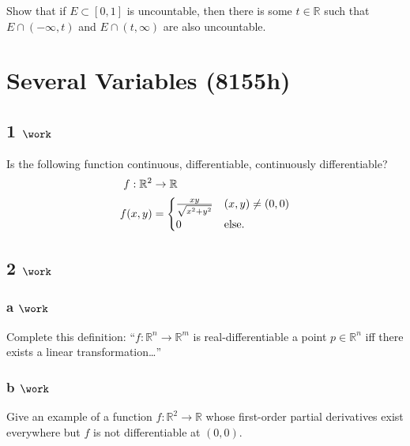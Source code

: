 Show that if \(E\subset [0, 1]\) is uncountable, then there is some
\(t\in {\mathbb{R}}\) such that \(E\cap(-\infty ,t)\) and
\(E\cap(t, \infty)\) are also uncountable.

\hypertarget{several-variables-8155h}{%
\section{Several Variables (8155h)}\label{several-variables-8155h}}

\hypertarget{work-9}{%
\subsection{\texorpdfstring{1
\(\work\)}{1 \textbackslash work}}\label{work-9}}

Is the following function continuous, differentiable, continuously
differentiable?
\begin{align*}  
f: {\mathbb{R}}^2 &\to {\mathbb{R}}\\
f(x, y) &= 
\begin{cases}
{xy \over \sqrt{x^2 + y^2}} & (x, y) \neq (0, 0) \\
0 & \text{else}.
\end{cases}
\end{align*}

\hypertarget{work-10}{%
\subsection{\texorpdfstring{2
\(\work\)}{2 \textbackslash work}}\label{work-10}}

\hypertarget{a-work}{%
\subsubsection{\texorpdfstring{a
\(\work\)}{a \textbackslash work}}\label{a-work}}

Complete this definition: ``\(f: {\mathbb{R}}^n\to {\mathbb{R}}^m\) is
real-differentiable a point \(p\in {\mathbb{R}}^n\) iff there exists a
linear transformation\ldots{}''

\hypertarget{b-work}{%
\subsubsection{\texorpdfstring{b
\(\work\)}{b \textbackslash work}}\label{b-work}}

Give an example of a function \(f:{\mathbb{R}}^2\to {\mathbb{R}}\) whose
first-order partial derivatives exist everywhere but \(f\) is not
differentiable at \((0, 0)\).

